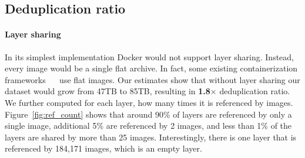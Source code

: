 \subsection{Deduplication ratio} 
\label{sec:dedup_ratio}

%
%
%

\paragraph{Layer sharing}

%

In its simplest implementation Docker would not support layer sharing.
%
Instead, every image would be a single flat archive.
%
In fact, some existing containerization frameworks
~\cite{singularity}~\cite{openvz} 
 use flat images.
%
Our estimates show that without layer sharing our dataset would grow from 47TB
to 85TB, resulting in \textbf{1.8$\times$} deduplication ratio.
% 
We further computed for each layer, how many times it is referenced by images.
%
Figure~\ref{fig:ref_count} shows that around 90\% of layers are referenced by
only a single image, additional 5\% are referenced by 2 images, and less than
1\% of the layers are shared by more than 25 images.
%
%
%
%
%
%
%
Interestingly, there is one layer that is referenced by 184,171 images, which is an empty layer.
%


